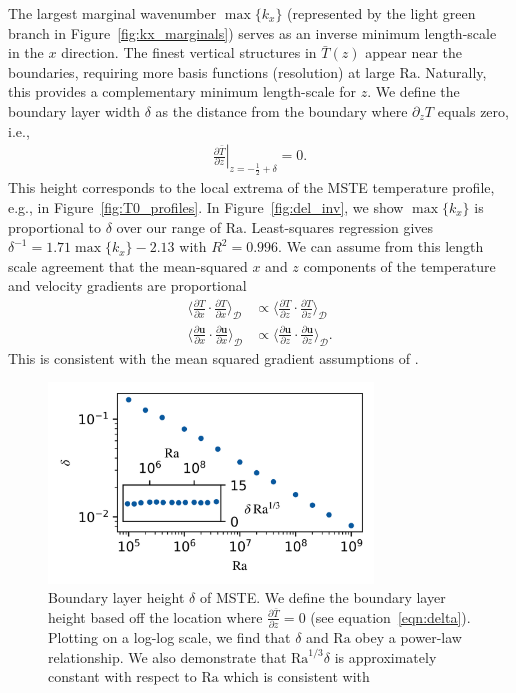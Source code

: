 \documentclass[reprint,amsmath,amssymb,aps]{revtex4-1}
\newcommand\Ra{\mathrm{Ra}}
\renewcommand{\vec}[1]{\boldsymbol{#1}}
\begin{document}
The largest marginal wavenumber $\max \{ k_x \}$ (represented by the light green branch in Figure~\ref{fig:kx_marginals}) serves as an inverse minimum length-scale in the $x$ direction.
The finest vertical structures in $\bar{T}(z)$ appear near the boundaries, requiring more basis functions (resolution) at large $\Ra$.
Naturally, this provides a complementary minimum length-scale for $z$.
We define the boundary layer width $\delta$ as the distance from the boundary where $\partial_z T$ equals zero, i.e.,
\begin{align}\label{eqn:delta}
\left.\frac{\partial \bar{T}}{\partial z}\right|_{z=-\frac{1}{2}+\delta} = 0.
\end{align}
This height corresponds to the local extrema of the MSTE temperature profile, e.g., in Figure~\ref{fig:T0_profiles}.
In Figure~\ref{fig:del_inv}, we show $\max \{ k_x\}$ is proportional to $\delta$ over our range of $\Ra$.
Least-squares regression gives $\delta^{-1} = 1.71 \max \{ k_x \} - 2.13$ with $R^2 = 0.996$.
We can assume from this length scale agreement that the mean-squared $x$ and $z$ components of the temperature and velocity gradients are proportional
\begin{align}
    \Big\langle \frac{\partial T}{\partial x} \cdot \frac{\partial T}{\partial x} \Big\rangle_{\mathcal{D}} &\propto \Big\langle \frac{\partial T}{\partial z} \cdot \frac{\partial T}{\partial z} \Big\rangle_{\mathcal{D}} \nonumber   \\
    \Big\langle \frac{\partial \vec{u}}{\partial x} \cdot \frac{\partial \vec{u}}{\partial x} \Big\rangle_{\mathcal{D}} &\propto \Big\langle \frac{\partial \vec{u}}{\partial z} \cdot \frac{\partial \vec{u}}{\partial z} \Big\rangle_{\mathcal{D}}.
\end{align}
This is consistent with the mean squared gradient assumptions of \cite{Malkus_1954}.

\begin{figure}
    \centering
    \includegraphics[width=3.4in]{del_ra.PNG}
    \caption{Boundary layer height $\delta$ of MSTE. 
    We define the boundary layer height based off the location where $\frac{\partial \bar{T}}{\partial z} = 0$ (see equation~\ref{eqn:delta}). 
    Plotting on a log-log scale, we find that $\delta$ and $\Ra$ obey a power-law relationship. We also demonstrate that $\Ra^{1/3}\delta$ is approximately constant with respect to $\Ra$ which is consistent with \cite{Malkus_1954}}
    \label{fig:bl_ra}
\end{figure}
\end{document}

